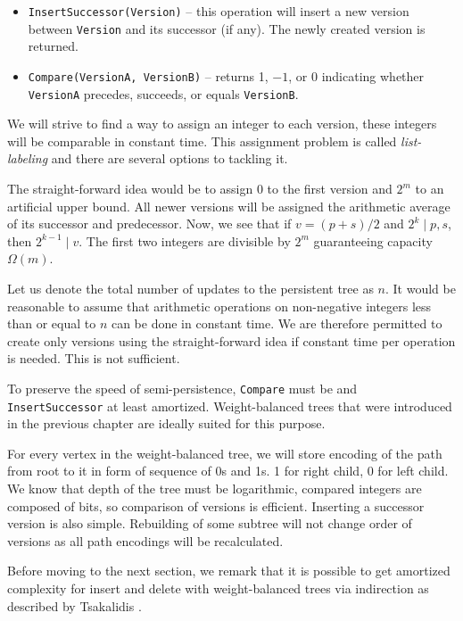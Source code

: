 \begin{itemize}
	\item \texttt{InsertSuccessor(Version)} -- this operation will insert a new version between \texttt{Version} and its successor (if any). The newly created version is returned.
	\item \texttt{Compare(VersionA, VersionB)} -- returns 1, $-1$, or 0 indicating whether \texttt{VersionA} precedes, succeeds, or equals \texttt{VersionB}.
\end{itemize}

We will strive to find a way to assign an integer to each version, these integers will be comparable in constant time. This assignment problem is called \emph{list-labeling} and there are several options to tackling it.

The straight-forward idea would be to assign 0 to the first version and $2^m$ to an artificial upper bound. All newer versions will be assigned the arithmetic average of its successor and predecessor. Now, we see that if $v = (p + s)/2$ and $ 2^k \mid p, s$, then $2^{k-1} \mid v$. The first two integers are divisible by $2^m$ guaranteeing capacity $\Omega(m)$. 

Let us denote the total number of updates to the persistent tree as $n$. It would be reasonable to  assume that arithmetic operations on non-negative integers less than or equal to $n$ can be done in constant time. We are therefore permitted to create only  versions using the straight-forward idea if constant time per operation is needed. This is not sufficient.

To preserve the speed of semi-persistence, \texttt{Compare} must be  and \texttt{InsertSuccessor}  at least amortized. Weight-balanced trees that were introduced in the previous chapter are ideally suited for this purpose.

For every vertex in the weight-balanced tree, we will store encoding of the path from root to it in form of sequence of 0s and 1s. 1 for right child, 0 for left child. We know that depth of the tree must be logarithmic, compared integers are composed of  bits, so comparison of versions is efficient. Inserting a successor version is also simple. Rebuilding of some subtree will not change order of versions as all path encodings will be recalculated.

Before moving to the next section, we remark that it is possible to get  amortized complexity for insert and delete with weight-balanced trees via indirection as described by Tsakalidis \cite{list-ordering}.

